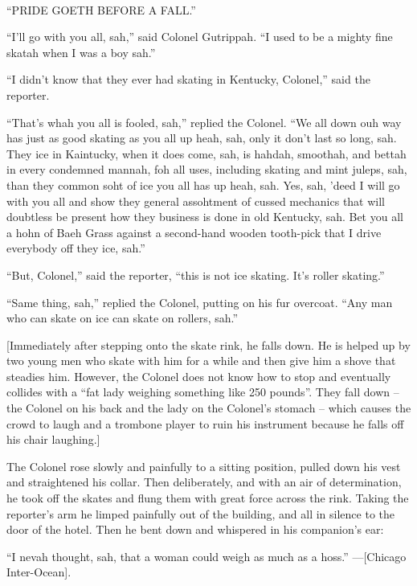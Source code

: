 \begin{ipquote}
\begin{center}
\\
“PRIDE GO{\kern0pt}ETH BEFORE A FALL.”\\
\end{center}

“I’ll go with you all, sah,” said Colonel Gutrippah. “I used to be a mighty fine skatah when I was a boy sah.”

“I didn’t know that they ever had skating in Kentucky, Colonel,” said the reporter.

“That’s whah you all is fooled, sah,” replied the Colonel. “We all down ouh way has just as good skating as you all up heah, sah, only it don’t last so long, sah. They ice in Kaintucky, when it do{\kern0pt}es come, sah, is hahdah, smoothah, and bettah in every condemned mannah, foh all uses, including skating and mint juleps, sah, than they common soht of ice you all has up heah, sah. Yes, sah, ’deed I will go with you all and show they general assohtment of cussed mechanics that will doubtless be present how they business is done in old Kentucky, sah. Bet you all a hohn of Baeh Grass against a second-hand wooden tooth-pick that I drive everybody off they ice, sah.”

“But, Colonel,” said the reporter, “this is not ice skating. It’s roller skating.”

“Same thing, sah,” replied the Colonel, putting on his fur overcoat. “Any man who can skate on ice can skate on rollers, sah.”

{[Immediately after stepping onto the skate rink, he falls down. He is helped up by two young men who skate with him for a while and then give him a shove that steadies him. However, the Colonel do{\kern0pt}es not know how to stop and eventually collides with a “fat lady weighing something like 250 pounds”. They fall down – the Colonel on his back and the lady on the Colonel’s stomach – which causes the crowd to laugh and a trombone player to ruin his instrument because he falls off his chair laughing.]}

The Colonel rose slowly and painfully to a sitting position, pulled down his vest and straightened his collar. Then deliberately, and with an air of determination, he took off the skates and flung them with great force across the rink. Taking the reporter’s arm he limped painfully out of the building, and all in silence to the door of the hotel. Then he bent down and whispered in his companion’s ear:

“I nevah thought, sah, that a woman could weigh as much as a hoss.” —[Chicago Inter-Ocean].
\end{ipquote}


